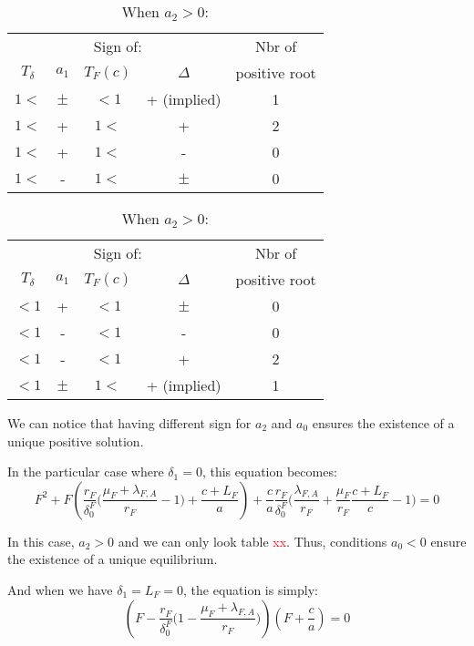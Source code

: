 \documentclass{article}
\newcommand{\lfa}{\lambda_{F, A}}
\newcommand{\df}{\delta_0^F}
\newcommand{\marc}[1]{\textcolor{red}{#1}}
\begin{document}
\begin{appendices}
\begin{table}[!ht]
\begin{minipage}[c]{0.45\linewidth}
\centering
\caption{When $a_2 < 0$:}
\begin{tabular}{c|c|c|c|c}
\multicolumn{4}{c|}{Sign of:} & Nbr of \\
$T_\delta$ & $a_1$ & $T_F(c)$ & $\Delta$ & positive root \\
\hline
$1 <$ & $\pm$ & $<1$ & + (implied) & 1 \\
$1 <$ & + & $1 <$ & + & 2 \\
$1 <$ & + & $1 <$ & - & 0 \\
$1 <$ & - & $1 <$ & $\pm$ & 0 \\
\end{tabular}
\end{minipage}
\hfill
\begin{minipage}[c]{0.45\linewidth}
\centering
\caption{When $a_2 > 0$:}
\begin{tabular}{c|c|c|c|c}
\multicolumn{4}{c|}{Sign of:} & Nbr of \\
$T_\delta$ & $a_1$ & $T_F(c)$ & $\Delta$ & positive root \\
\hline
$<1$ & + & $<1$ & $\pm$ & 0 \\
$<1$ & - & $<1$ & - & 0 \\
$<1$ & - & $<1$ & + & 2 \\
$<1$ & $\pm$ & $1<$  & + (implied) & 1 \\
\end{tabular}
\end{minipage}
\end{table}

We can notice that having different sign for $a_2$ and $a_0$ ensures the existence of a unique positive solution.

In the particular case where $\delta_1 = 0$, this equation becomes:
\begin{equation}
F^2 
+ F \left( \dfrac{r_F}{\df}\Big(\dfrac{\mu_F + \lfa}{r_F} - 1\Big)  + \dfrac{c + L_F}{a} \right) + 
 \dfrac{c}{a} \dfrac{r_F }{\df}\Big( \dfrac{\lfa}{r_F} + \dfrac{\mu_F}{r_F}\dfrac{c + L_F}{c} -1 \Big) = 0
\label{anthropic:Functional,d1=0:FH:eqF}
\end{equation}

In this case, $a_2 > 0$ and we can only look table \marc{xx}. Thus, conditions $a_0 < 0$ ensure the existence of a unique equilibrium.

And when we have $\delta_1 = L_F = 0$, the equation is simply:
\begin{equation}
\left(F - \dfrac{r_F}{\df}\Big(1 - \dfrac{\mu_F + \lfa}{r_F}\Big) \right) \left(F + \dfrac{c}{a} \right) = 0
\label{anthropic:Functional,d1=LF=0:FH:eqF}
\end{equation}


\end{appendices}
\end{document}
